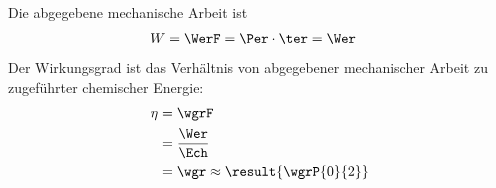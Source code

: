 Die abgegebene mechanische Arbeit ist
\begin{align}
 W &= \WerF = \Per\cdot\ter = \Wer
\end{align}
Der Wirkungsgrad ist das Verhältnis von abgegebener mechanischer Arbeit zu zugeführter chemischer Energie:
\begin{align}
 \eta &= \wgrF \\
   &= \frac{\Wer}{\Ech} \\
   &= \wgr \approx \result{\wgrP{0}{2}}
\end{align}

